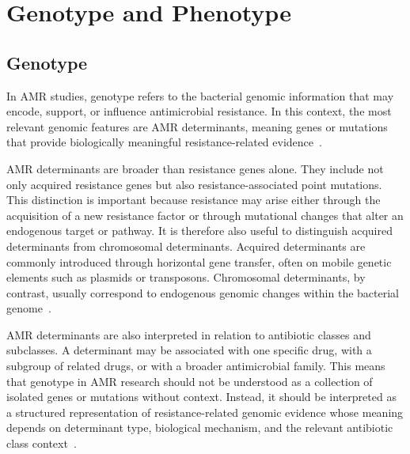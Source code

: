 \section{Genotype and Phenotype}

\subsection{Genotype}

In AMR studies, genotype refers to the bacterial genomic information that may encode, support, or influence antimicrobial resistance. In this context, the most relevant genomic features are AMR determinants, meaning genes or mutations that provide biologically meaningful resistance-related evidence~\citep{munita2016mechanisms,feldgarden2021amrfinderplus}.

AMR determinants are broader than resistance genes alone. They include not only acquired resistance genes but also resistance-associated point mutations. This distinction is important because resistance may arise either through the acquisition of a new resistance factor or through mutational changes that alter an endogenous target or pathway. It is therefore also useful to distinguish acquired determinants from chromosomal determinants. Acquired determinants are commonly introduced through horizontal gene transfer, often on mobile genetic elements such as plasmids or transposons. Chromosomal determinants, by contrast, usually correspond to endogenous genomic changes within the bacterial genome~\citep{blair2014mechanisms,munita2016mechanisms,vonwintersdorff2016dissemination,feldgarden2021amrfinderplus}.

AMR determinants are also interpreted in relation to antibiotic classes and subclasses. A determinant may be associated with one specific drug, with a subgroup of related drugs, or with a broader antimicrobial family. This means that genotype in AMR research should not be understood as a collection of isolated genes or mutations without context. Instead, it should be interpreted as a structured representation of resistance-related genomic evidence whose meaning depends on determinant type, biological mechanism, and the relevant antibiotic class context~\citep{feldgarden2021amrfinderplus}.

